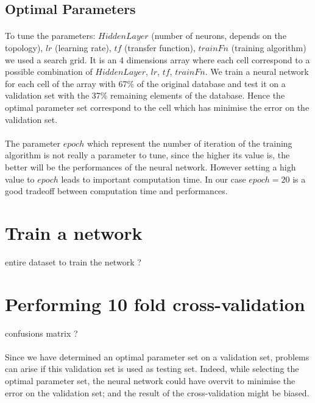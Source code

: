 \documentclass[a4paper,12pt,oneside,final]{report}
\begin{document}
\subsection{Optimal Parameters}
\label{ch:opset}
\paragraph{}
To tune the parameters: $HiddenLayer$ (number of neurons, depends on the topology), $lr$ (learning rate), $tf$ (transfer function), $trainFn$ (training algorithm) we used a search grid. It is an 4 dimensions array where each cell correspond to a possible combination of $HiddenLayer$, $lr$, $tf$, $trainFn$. We train a neural network for each cell of the array with 67\% of the original database and test it on a validation set with the 37\% remaining elements of the database. Hence the optimal parameter set correspond to the cell which has minimise the error on the validation set.
\paragraph{}
The parameter $epoch$ which represent the number of iteration of the training algorithm is not really a parameter to tune, since the higher its value is, the better will be the performances of the neural network. However setting a high value to $epoch$ leads to important computation time. In our case $epoch=20$ is a good tradeoff between computation time and performances.

\section{Train a network}
{\color{red} entire dataset to train the network ?}

\section{Performing 10 fold cross-validation}
{\color{red} confusions matrix ?}

\paragraph{}
Since we have determined an optimal parameter set on a validation set, problems can arise if this validation set is used as testing set. Indeed, while selecting the optimal parameter set, the neural network could have overvit to minimise the error on the validation set; and the result of the cross-validation might be biased.
\end{document}
